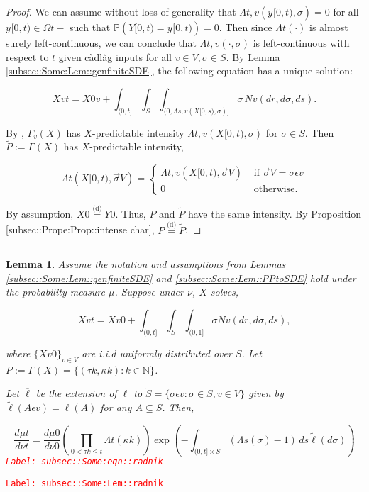\documentclass[12pt]{article}
\newcommand{\mb}{\mathbb}
\newcommand{\ov}{\overline}
\newcommand{\te}{\text}
\newcommand{\ep}{\epsilon}
\newcommand{\tr}{\textcolor{red}}
\newcommand{\labe}[1]{\tr{\texttt{Label: #1}}}
\newcommand{\ind}{\hspace{24pt}}
\newcommand{\lin}{\rule{\linewidth}{0.4 pt}}
\newcommand{\pr}{\mb{P}}							%
\newcommand{\deq}{\overset{\text{(d)}}{=}}			%
\newcommand{\defeq}{:=}								%
\renewcommand{\v}{v}							%
\renewcommand{\S}{S}							%
\newcommand{\s}{\sigma}							%
\newcommand{\sv}{\vec{\s}}						%
\newcommand{\ev}{\ep}							%
\renewcommand{\t}{t}							%
\renewcommand{\tt}{s}							%
\newcommand{\X}{X}								%
\newcommand{\poiss}{N}							%
\newcommand{\Sm}{\ell}							%
\renewcommand{\r}{r}							%
\newcommand{\alt}[1]{\widetilde{#1}}			%
\newcommand{\m}{\mu}							%
\newcommand{\mm}{\nu}							%
\newcommand{\XX}{Y}								%
\newcommand{\rt}{\tau}							%
\renewcommand{\it}{k}							%
\newcommand{\pmap}[1]{\Gamma_{#1}}				%
\renewcommand{\mark}{\kappa}					%
\newcommand{\rp}{P}								%
\newcommand{\typset}{A}							%
\newcommand{\ratee}{\Lambda}					%
\newcommand{\xvtts}[2]{y_{#1}{#2}}					%
\newtheorem{lem}[thms]{Lemma}
\begin{document}
\begin{proof}

We can assume without loss of generality that \(\ratee{\t,\v}(\xvtts{}{[0,\t)},\s) = 0\) for all \(\xvtts{}{[0,\t)}\in \Omega{}{\t-}\) such that \(\pr(\XX{}{[0,\t)} = \xvtts{}{[0,\t)}) = 0\). Then since \(\ratee{\t}(\cdot)\) is almost surely left-continuous, we can conclude that \(\ratee{\t,\v}(\cdot,\s)\) is left-continuous with respect to \(\t\) given c\`adl\`ag inputs for all \(\v\in  V,\s\in\S\). By Lemma \ref{subsec::Some:Lem::genfiniteSDE}, the following equation has a unique solution:

\[\X{\v}{\t} = \X{0}{\v} + \int_{(0,\t]}\int_\S\int_{(0,\ratee{\tt,\v}(\X{}{[0,\tt)},\s)]}  \s\,\poiss{\v}(d\r,d\s,d\tt).\]

By \cite[Exercise 14.7.1]{DalVer08}, \(\pmap{\v}(\X{}{})\) has \(\X{}{}\)-predictable intensity \(\ratee{\t,\v}(\X{}{[0,\t)},\s)\) for \(\s \in \S\). Then \(\alt{\rp{}} \defeq \pmap{}(\X{}{})\) has \(\X{}{}\)-predictable intensity,

\[\ratee{\t}(\X{}{[0,\t)},\sv{}{ V}) = \begin{cases}
\ratee{\t,\v}(\X{}{[0,\t)},\sv{}{ V}) &\te{ if } \sv{}{ V} = \s\ev{\v}\\
0&\te{ otherwise.}
\end{cases}\]

By assumption, \(\X{}{0} \deq \XX{}{0}\). Thus, \(\rp{}\) and \(\alt{\rp{}}\) have the same intensity. By Proposition \ref{subsec::Prope:Prop::intense char}, \(\rp{} \deq \alt{\rp{}}\).
\end{proof}
\lin

\begin{lem}
Assume the notation and assumptions from Lemmas \ref{subsec::Some:Lem::genfiniteSDE} and \ref{subsec::Some:Lem::PPtoSDE} hold under the probability measure \(\m{}{}{}\). Suppose under \(\mm{}{}{}\), \(\X{}{}\) solves,

\[\X{\v}{\t} = \X{\v}{0} +\int_{(0,\t]}\int_\S\int_{(0,1]} \s \poiss{\v}(d\r,d\s,d\tt),\]

where \(\{\X{\v}{0}\}_{\v \in  V}\) are i.i.d uniformly distributed over \(\S\). Let \(\rp{} \defeq \pmap{}(\X{}{}) = \{(\rt{\it},\mark{\it}):\it\in \mb{N}\}\).

\ind Let \(\ov{\ell}\) be the extension of \(\Sm\) to \(\alt{\S} = \{\s\ev{\v}: \s \in \S, \v \in  V\}\) given by \(\alt{\Sm}(\typset\ev{\v}) = \Sm(\typset)\) for any \(\typset \subseteq \S\). Then,

\begin{equation}
\frac{d\m{}{\t}{}}{d\mm{}{\t}{}}= \frac{d\m{}{0}{}}{d\mm{}{0}{}}\left(\prod_{0< \rt{\it}\leq t} \ratee{\t}(\mark{\it})\right)\exp\left(-\int_{(0,\t]\times \S} (\ratee{\tt}(\s) - 1)\,d\tt\alt{\Sm}(d\s)\right)
\label{subsec::Some:eqn::radnik}
\end{equation}
\labe{subsec::Some:eqn::radnik}
\label{subsec::Some:Lem::radnik}
\end{lem}
\labe{subsec::Some:Lem::radnik}
\end{document}
